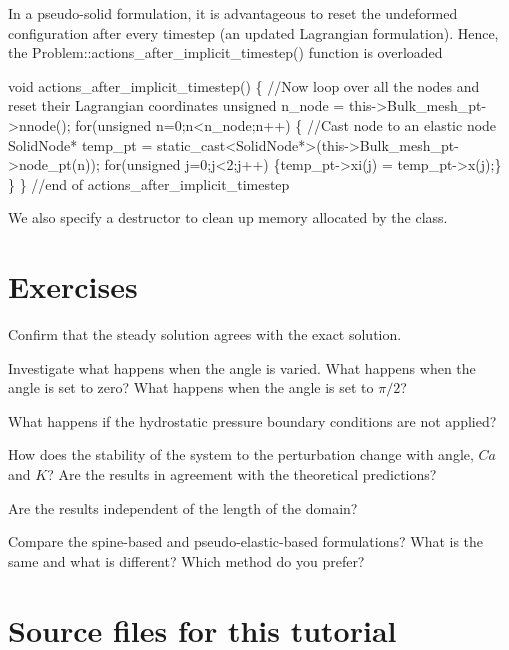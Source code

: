 In a pseudo-\/solid formulation, it is advantageous to reset the undeformed configuration after every timestep (an updated Lagrangian formulation). Hence, the {\ttfamily Problem\+::actions\+\_\+after\+\_\+implicit\+\_\+timestep()} function is overloaded 
\begin{DoxyCodeInclude}
 \textcolor{keywordtype}{void} actions\_after\_implicit\_timestep()
  \{
   \textcolor{comment}{//Now loop over all the nodes and reset their Lagrangian coordinates}
   \textcolor{keywordtype}{unsigned} n\_node = this->Bulk\_mesh\_pt->nnode();
   \textcolor{keywordflow}{for}(\textcolor{keywordtype}{unsigned} n=0;n<n\_node;n++)
    \{
     \textcolor{comment}{//Cast node to an elastic node}
     SolidNode* temp\_pt = 
      \textcolor{keyword}{static\_cast<}SolidNode*\textcolor{keyword}{>}(this->Bulk\_mesh\_pt->node\_pt(n));
     \textcolor{keywordflow}{for}(\textcolor{keywordtype}{unsigned} j=0;j<2;j++) \{temp\_pt->xi(j) = temp\_pt->x(j);\}
    \}
  \} \textcolor{comment}{//end of actions\_after\_implicit\_timestep}

\end{DoxyCodeInclude}


We also specify a destructor to clean up memory allocated by the class.



 

\hypertarget{index_exercises}{}\section{Exercises}\label{index_exercises}

\begin{DoxyEnumerate}
\item Confirm that the steady solution agrees with the exact solution.
\item Investigate what happens when the angle is varied. What happens when the angle is set to zero? What happens when the angle is set to $\pi/2$?
\item What happens if the hydrostatic pressure boundary conditions are not applied?
\item How does the stability of the system to the perturbation change with angle, $ Ca $ and $ K $? Are the results in agreement with the theoretical predictions?
\item Are the results independent of the length of the domain?
\item Compare the spine-\/based and pseudo-\/elastic-\/based formulations? What is the same and what is different? Which method do you prefer? 

 


\end{DoxyEnumerate}\hypertarget{index_sources}{}\section{Source files for this tutorial}\label{index_sources}

